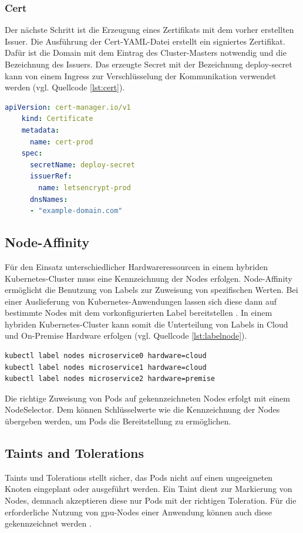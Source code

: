 \subsubsection{Cert}
Der nächste Schritt ist die Erzeugung eines Zertifikats mit dem vorher erstellten Issuer.
Die Ausführung der Cert-YAML-Datei erstellt ein signiertes Zertifikat.
Dafür ist die Domain mit dem Eintrag des Cluster-Masters notwendig und die Bezeichnung des Issuers.
Das erzeugte Secret mit der Bezeichnung deploy-secret kann von einem Ingress zur Verschlüsselung der Kommunikation verwendet werden (vgl. Quellcode \ref{lst:cert}). 

\begin{lstlisting}[caption={cert.yaml \cite{certmanageracme} },captionpos=b,label={lst:cert},language=yaml]
    apiVersion: cert-manager.io/v1
    kind: Certificate
    metadata:
      name: cert-prod
    spec:
      secretName: deploy-secret
      issuerRef: 
        name: letsencrypt-prod
      dnsNames:
      - "example-domain.com"

\end{lstlisting}


\subsection{Node-Affinity} \label{Nodeaffinity}
Für den Einsatz unterschiedlicher Hardwareressourcen in einem hybriden Kubernetes-Cluster muss eine Kennzeichnung der Nodes erfolgen.
Node-Affinity ermöglicht die Benutzung von Labels zur Zuweisung von spezifischen Werten.
Bei einer Auslieferung von Kubernetes-Anwendungen lassen sich diese dann auf bestimmte Nodes mit dem vorkonfigurierten Label bereitstellen \cite{nodeaffinity}.
In einem hybriden Kubernetes-Cluster kann somit die Unterteilung von Labels in Cloud und On-Premise Hardware erfolgen (vgl. Quellcode \ref{lst:labelnode}).


\begin{lstlisting}[caption={Node-Labels},captionpos=b,label={lst:labelnode},language=bash]
kubectl label nodes microservice0 hardware=cloud
kubectl label nodes microservice1 hardware=cloud
kubectl label nodes microservice2 hardware=premise
\end{lstlisting}

Die richtige Zuweisung von Pods auf gekennzeichneten Nodes erfolgt mit einem NodeSelector.
Dem können Schlüsselwerte wie die Kennzeichnung der Nodes übergeben werden, um Pods die Bereitstellung zu ermöglichen.

\subsection{Taints and Tolerations}
Taints und Tolerations stellt sicher, das Pods nicht auf einen ungeeigneten Knoten eingeplant oder ausgeführt werden.
Ein Taint dient zur Markierung von Nodes, demnach akzeptieren diese nur Pods mit der richtigen Toleration.
Für die erforderliche Nutzung von \acs{gpu}-Nodes einer Anwendung können auch diese gekennzeichnet werden \cite{taintstolerations}.

